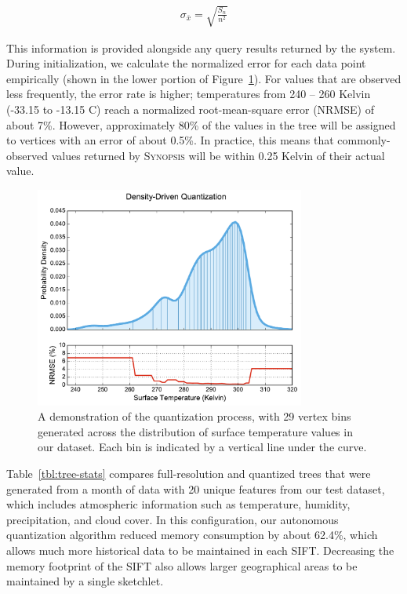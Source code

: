 \begin{align*}
    \sigma_{\bar{x}} = \sqrt{\frac{S_n}{n^2}}
\end{align*}

This information is provided alongside any query results returned by the system. During initialization, we calculate the normalized error for each data point empirically (shown in the lower portion of Figure~\ref{fig:quantization}). For values that are observed less frequently, the error rate is higher; temperatures from 240 -- 260 Kelvin (-33.15 to -13.15 \degree C) reach a normalized root-mean-square error (NRMSE) of about 7\%. However, approximately 80\% of the values in the tree will be assigned to vertices with an error of about 0.5\%. In practice, this means that commonly-observed values returned by \textsc{Synopsis} will be within 0.25 Kelvin of their actual value.

\begin{figure}
    \centerline{\includegraphics[width=3.5in]{figures/quantization.pdf}}
    \caption{A demonstration of the quantization process, with 29 vertex bins generated across the distribution of surface temperature values in our dataset. Each bin is indicated by a vertical line under the curve.}
    \label{fig:quantization}
\end{figure}

Table~\ref{tbl:tree-stats} compares full-resolution and quantized trees that were generated from a month of data with 20 unique features from our test dataset, which includes atmospheric information such as temperature, humidity, precipitation, and cloud cover. In this configuration, our autonomous quantization algorithm reduced memory consumption by about 62.4\%, which allows much more historical data to be maintained in each SIFT. Decreasing the memory footprint of the SIFT also allows larger geographical areas to be maintained by a single sketchlet.

